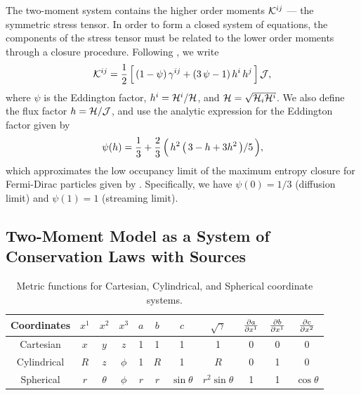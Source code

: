 \documentclass[10pt,preprint]{aastex}
\begin{document}
The two-moment system contains the higher order moments $\mathcal{K}^{ij}$ --- the symmetric stress tensor.  
In order to form a closed system of equations, the components of the stress tensor must be related to the lower order moments through a closure procedure.  
Following \citet{levermore_1984}, we write
\begin{equation}
  \mathcal{K}^{ij}
  =\frac{1}{2}\,\Big[\,(1-\psi)\,\gamma^{ij}+(3\,\psi-1)\,h^{i}\,h^{j}\,\Big]\,\mathcal{J},
\end{equation}
where $\psi$ is the Eddington factor, $h^{i}=\mathcal{H}^{i}/\mathcal{H}$, and $\mathcal{H}=\sqrt{\mathcal{H}_{i}\mathcal{H}^{i}}$.  
We also define the flux factor $h=\mathcal{H}/\mathcal{J}$, and use the analytic expression for the Eddington factor \citep{minerbo_1978} given by 
\begin{equation}
  \psi(h)=\frac{1}{3}+\frac{2}{3}\,\Big(\,h^{2}\,\big(\,3-h+3h^{2}\,\big)/5\,\Big),
\end{equation}
which approximates the low occupancy limit of the maximum entropy closure for Fermi-Dirac particles given by \citet{cernohorskyBludman_1994}.  
Specifically, we have $\psi(0)=1/3$ (diffusion limit) and $\psi(1)=1$ (streaming limit).  

\subsection{Two-Moment Model as a System of Conservation Laws with Sources}

\begin{table}
  \begin{center}
  \caption{Metric functions for Cartesian, Cylindrical, and Spherical coordinate systems.\label{tab:metricFunctions}}
  \begin{tabular}{ccccccccccc}
    \midrule
    Coordinates & $x^{1}$ & $x^{2}$ & $x^{3}$ & $a$ & $b$ & $c$ & $\sqrt{\gamma}$
    & $\frac{\partial a}{\partial x^{1}}$ & $\frac{\partial b}{\partial x^{1}}$ & $\frac{\partial c}{\partial x^{2}}$ \\
    \midrule
    \midrule
    Cartesian & $x$ & $y$ & $z$ & 1 & 1 & 1 & 1 & 0 & 0 & 0 \\
    Cylindrical & $R$ & $z$ & $\phi$ & 1 & $R$ & 1 & $R$ & 0 & 1 & 0 \\
    Spherical & $r$ & $\theta$ & $\phi$ & $r$ & $r$ & $\sin\theta$ & $r^{2}\sin\theta$ & 1 & 1 & $\cos\theta$ \\
    \midrule
    \midrule
  \end{tabular}
  \end{center}
\end{table}
\end{document}

